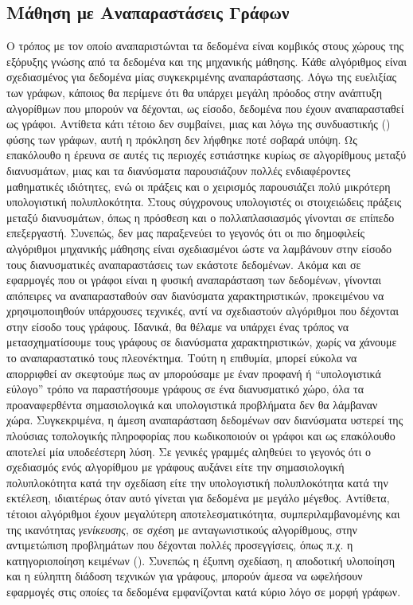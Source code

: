 \subsection{Μάθηση με Αναπαραστάσεις Γράφων}
Ο τρόπος με τον οποίο αναπαριστώνται τα δεδομένα είναι κομβικός στους χώρους της εξόρυξης γνώσης από τα δεδομένα και της μηχανικής μάθησης.
Κάθε αλγόριθμος είναι σχεδιασμένος για δεδομένα μίας συγκεκριμένης αναπαράστασης.
Λόγω της ευελιξίας των γράφων, κάποιος θα περίμενε ότι θα υπάρχει μεγάλη πρόοδος στην ανάπτυξη αλγορίθμων που μπορούν να δέχονται, ως είσοδο, δεδομένα που έχουν αναπαρασταθεί ως γράφοι.
Αντίθετα κάτι τέτοιο δεν συμβαίνει, μιας και λόγω της συνδυαστικής () φύσης των γράφων, αυτή η πρόκληση δεν λήφθηκε ποτέ σοβαρά υπόψη.
Ως επακόλουθο η έρευνα σε αυτές τις περιοχές εστιάστηκε κυρίως σε αλγορίθμους μεταξύ διανυσμάτων, μιας και τα διανύσματα παρουσιάζουν πολλές ενδιαφέροντες μαθηματικές ιδιότητες, ενώ οι πράξεις και ο χειρισμός παρουσιάζει πολύ μικρότερη υπολογιστική πολυπλοκότητα. Στους σύγχρονους υπολογιστές οι στοιχειώδεις πράξεις μεταξύ διανυσμάτων, όπως η πρόσθεση και ο πολλαπλασιασμός γίνονται σε επίπεδο επεξεργαστή.
Συνεπώς, δεν μας παραξενεύει το γεγονός ότι οι πιο δημοφιλείς αλγόριθμοι μηχανικής μάθησης είναι σχεδιασμένοι ώστε να λαμβάνουν στην είσοδο τους διανυσματικές αναπαραστάσεις των εκάστοτε δεδομένων. 
Ακόμα και σε εφαρμογές που οι γράφοι είναι η φυσική αναπαράσταση των δεδομένων, γίνονται απόπειρες να αναπαρασταθούν σαν διανύσματα χαρακτηριστικών, προκειμένου να χρησιμοποιηθούν υπάρχουσες τεχνικές, αντί να σχεδιαστούν αλγόριθμοι που δέχονται στην είσοδο τους γράφους.
Ιδανικά, θα θέλαμε να υπάρχει ένας τρόπος να μετασχηματίσουμε τους γράφους σε διανύσματα χαρακτηριστικών, χωρίς να χάνουμε το αναπαραστατικό τους πλεονέκτημα.
Τούτη η επιθυμία, μπορεί εύκολα να απορριφθεί αν σκεφτούμε πως αν μπορούσαμε με έναν προφανή ή ``υπολογιστικά εύλογο'' τρόπο να παραστήσουμε γράφους σε ένα διανυσματικό χώρο, όλα τα προαναφερθέντα σημασιολογικά και υπολογιστικά προβλήματα δεν θα λάμβαναν χώρα.
Συγκεκριμένα, η άμεση αναπαράσταση δεδομένων σαν διανύσματα υστερεί της πλούσιας τοπολογικής πληροφορίας που κωδικοποιούν οι γράφοι και ως επακόλουθο αποτελεί μία υποδεέστερη λύση.
Σε γενικές γραμμές αληθεύει το γεγονός ότι ο σχεδιασμός ενός αλγορίθμου με γράφους αυξάνει είτε την σημασιολογική πολυπλοκότητα κατά την σχεδίαση είτε την υπολογιστική πολυπλοκότητα κατά την εκτέλεση, ιδιαιτέρως όταν αυτό γίνεται για δεδομένα με μεγάλο μέγεθος.
Αντίθετα, τέτοιοι αλγόριθμοι έχουν μεγαλύτερη αποτελεσματικότητα, συμπεριλαμβανομένης και της ικανότητας \textit{γενίκευσης}, σε σχέση με ανταγωνιστικούς αλγορίθμους, στην αντιμετώπιση προβλημάτων που δέχονται πολλές προσεγγίσεις, όπως π.χ. η κατηγοριοποίηση κειμένων ().
Συνεπώς η έξυπνη σχεδίαση, η αποδοτική υλοποίηση και η εύληπτη διάδοση τεχνικών για γράφους, μπορούν άμεσα να ωφελήσουν εφαρμογές στις οποίες τα δεδομένα εμφανίζονται κατά κύριο λόγο σε μορφή γράφων.
